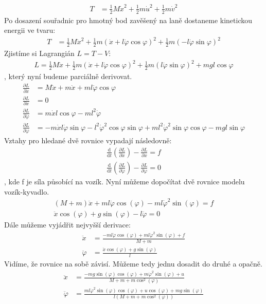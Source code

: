 \documentclass[a4paper, 12pt]{article}
\begin{document}
			\begin{align*}
				T &= \frac{1}{2}M\dot{x}^2+\frac{1}{2}m\dot{u}^2+\frac{1}{2}m\dot{v}^2
			\end{align*}
			Po dosazení souřadnic pro hmotný bod zavěšený na laně dostaneme kinetickou energii ve tvaru:
			\begin{align*}
				T &= \frac{1}{2}M\dot{x}^2+\frac{1}{2}m\left(\dot{x}+l\dot{\varphi}\cos\varphi\right)^2+\frac{1}{2}m\left(-l\dot{\varphi}\sin\varphi\right)^2
			\end{align*}
			Zjistíme si Lagrangián $L = T - V$:
			\begin{align*}
				L = \frac{1}{2}M\dot{x}+\frac{1}{2}m\left(\dot{x}+l\dot{\varphi}\cos\varphi\right)^2+\frac{1}{2}m\left(l\dot{\varphi}\sin\varphi\right)^2+mgl\cos\varphi
			\end{align*}
			, který nyní budeme parciálně derivovat.
			\begin{align*}
				\frac{\partial L}{\partial\dot{x}} &= M\dot{x}+m\dot{x}+ml\dot{\varphi}\cos\varphi\\
				\frac{\partial L}{\partial x} &= 0\\
				\frac{\partial L}{\partial \dot{\varphi}} &= m\dot{x}l\cos\varphi - ml^2\dot{\varphi}\\
				\frac{\partial L}{\partial \varphi} &= -m\dot{x}l\dot{\varphi}\sin\varphi-l^2\dot{\varphi}^2\cos\varphi\sin\varphi+ml^2\dot{\varphi}^2\sin\varphi\cos\varphi-mgl\sin\varphi
			\end{align*}
			Vztahy pro hledané dvě rovnice vypadají následovně:
			\begin{align*}
				\frac{\mathrm{d}}{\mathrm{d}t}\left(\frac{\partial L}{\partial \dot{x}}\right)-\frac{\partial L}{\partial x} = f\\
				\frac{\mathrm{d}}{\mathrm{d}t}\left(\frac{\partial L}{\partial \dot{\varphi}}\right)-\frac{\partial L}{\partial \varphi} = 0
			\end{align*}
			, kde f je síla působící na vozík. Nyní můžeme dopočítat dvě rovnice modelu vozík-kyvadlo.
			\begin{align}
				\left(M+m\right)\ddot{x}+ml\ddot{\varphi}\cos(\varphi)-ml\dot{\varphi}^2\sin(\varphi) = f
				\label{rovnice_model_1}\\
				\ddot{x}\cos(\varphi)+g\sin(\varphi)-l\ddot{\varphi} = 0
			    \label{rovnice_model_2}
			\end{align}
			Dále můžeme vyjádřit nejvyšší derivace:
			\begin{align*}
				\ddot{x} &= \frac{-ml\ddot{\varphi}\cos(\varphi)+ml\dot{\varphi}^2\sin(\varphi)+f}{M+m}\\
				\ddot{\varphi}&=\frac{\ddot{x}\cos(\varphi)+g\sin(\varphi)}{l}
			\end{align*}
			Vidíme, že rovnice na sobě závisí. Můžeme tedy jednu dosadit do druhé a opačně.
			\begin{align*}
				\ddot{x}&=\frac{-mg\sin(\varphi)\cos(\varphi)+m\dot{\varphi}^2\sin(\varphi)+u}{M+m+m\cos^2(\varphi)}\\
				\ddot{\varphi}&=\frac{ml\dot{\varphi}^2\sin(\varphi)\cos(\varphi)+u\cos(\varphi)+mg\sin(\varphi)}{l\left(M+m+m\cos^2(\varphi)\right)}
			\end{align*}
\end{document}
